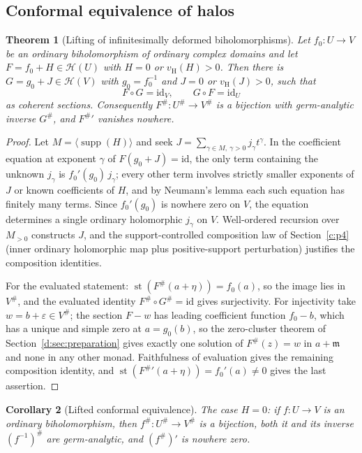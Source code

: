 \documentclass[11pt,a4paper]{article}
\numberwithin{equation}{section}
\newtheorem{theorem}{Theorem}[section]
\newtheorem{corollary}[theorem]{Corollary}
\theoremstyle{definition}
\theoremstyle{remark}
\theoremstyle{plain}
\newcommand{\mm}{\mathfrak m}
\DeclareMathOperator{\supp}{supp}
\DeclareMathOperator{\st}{st}
\newcommand{\tm}{t}
\newcommand{\halo}[1]{#1^{\#}}
\newcommand{\ev}[1]{#1^{\#}}
\newcommand{\Hc}{\mathcal H}
\newcommand{\vH}{v_{\mathrm H}}
\newcommand{\Neu}[1]{\langle #1\rangle}
\begin{document}
\subsection{Conformal equivalence of halos}\label{e:sec-conformal}

\begin{theorem}[Lifting of infinitesimally deformed biholomorphisms]
\label{e:thm-biholo}
Let $f_0:U\to V$ be an ordinary biholomorphism of ordinary complex domains
and let $F=f_0+H\in\Hc(U)$ with $H=0$ or $\vH(H)>0$.  Then there is
$G=g_0+J\in\Hc(V)$ with $g_0=f_0^{-1}$ and $J=0$ or $\vH(J)>0$, such that
\[
 F\circ G=\mathrm{id}_V,\qquad G\circ F=\mathrm{id}_U
\]
as coherent sections.  Consequently $\ev F:\halo U\to\halo V$ is a
bijection with germ-analytic inverse $\ev G$, and $\ev F{}'$ vanishes
nowhere.
\end{theorem}

\begin{proof}
Let $M=\Neu{\supp(H)}$ and seek
$J=\sum_{\gamma\in M,\ \gamma>0}j_\gamma\tm^\gamma$.  In the coefficient
equation at exponent $\gamma$ of $F(g_0+J)=\mathrm{id}$, the only term
containing the unknown $j_\gamma$ is $f_0'(g_0)\,j_\gamma$; every other
term involves strictly smaller exponents of $J$ or known coefficients of
$H$, and by Neumann's lemma each such equation has finitely many terms.
Since $f_0'(g_0)$ is nowhere zero on $V$, the equation determines a single
ordinary holomorphic $j_\gamma$ on $V$.  Well-ordered recursion over
$M_{>0}$ constructs $J$, and the support-controlled composition law of
Section~\ref{c:p4} (inner ordinary holomorphic map plus positive-support perturbation)
justifies the composition identities.

For the evaluated statement: $\st(\ev F(a+\eta))=f_0(a)$, so the image lies
in $\halo V$, and the evaluated identity $\ev F\circ\ev G=\mathrm{id}$
gives surjectivity.  For injectivity take $w=b+\varepsilon\in\halo V$; the
section $F-w$ has leading coefficient function $f_0-b$, which has a unique
and simple zero at $a=g_0(b)$, so the zero-cluster theorem of Section~\ref{d:sec:preparation} gives
exactly one solution of $\ev F(z)=w$ in $a+\mm$ and none in any other
monad.  Faithfulness of evaluation gives the remaining composition
identity, and
$\st(\ev F{}'(a+\eta))=f_0'(a)\ne0$ gives the last assertion.
\end{proof}

\begin{corollary}[Lifted conformal equivalence]\label{e:cor-liftbiholo}
The case $H=0$: if $f:U\to V$ is an ordinary biholomorphism, then
$\ev f:\halo U\to\halo V$ is a bijection, both it and its inverse
$\ev{(f^{-1})}$ are germ-analytic, and $(\ev f)'$ is nowhere zero.
\end{corollary}
\end{document}

